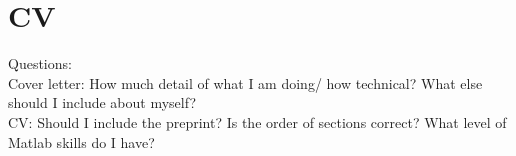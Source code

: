 \documentclass[11pt, a4paper]{article}
\theoremstyle{definition}
\begin{document}
\section{CV}
Questions:\\
Cover letter: How much detail of what I am doing/ how technical? What else should I include about myself?\\
CV: Should I include the preprint? Is the order of sections correct? What level of Matlab skills do I have?
\end{document}
